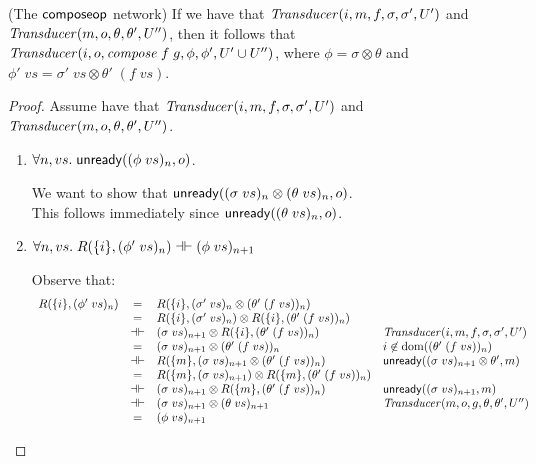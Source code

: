 \begin{lemma}{(The $\mathsf{composeop}$ network)}
If we have that $\mathit{Transducer}(i, m, f, \sigma, \sigma', U')$ and $\mathit{Transducer}(m, o, \theta, \theta', U'')$, 
then it follows that $\mathit{Transducer}(i, o, \mathit{compose}\;f\;g, \phi, \phi', U' \cup U'')$, where $\phi = \sigma \otimes \theta$
and $\phi'\;vs = \sigma'\;vs \otimes \theta'\;(f\;vs)$. 
\end{lemma}

\begin{proof}
Assume have that $\mathit{Transducer}(i, m, f, \sigma, \sigma', U')$ and $\mathit{Transducer}(m, o, \theta, \theta', U'')$. 
\begin{enumerate}
\item $\forall n, vs.\; \mathsf{unready}({(\phi\;vs)_n}, {o})$.

  \begin{tabbedproof}
    \oo We want to show that $\mathsf{unready}({(\sigma\;vs)_n \otimes (\theta\;vs)_n}, {o})$. \\
    \oo This follows immediately since $\mathsf{unready}({(\theta\;vs)_n}, {o})$.
  \end{tabbedproof}

\item $\forall n, vs.\; R(\{{i}\}, (\phi'\;vs)_n) \dashv\vdash (\phi\;vs)_{n+1}$

  Observe that:
  \begin{displaymath}
    \begin{array}{lcll}
      R(\{{i}\}, (\phi'\;vs)_n) & = & R(\{{i}\}, (\sigma'\;vs)_n \otimes (\theta'\;(f\;vs))_n) 
                            & \\
                            & = & R(\{{i}\}, (\sigma'\;vs)_n) \otimes R(\{{i}\}, (\theta'\;(f\;vs))_n) 
                            & \\
                            & \dashv\vdash & (\sigma\;vs)_{n+1} \otimes R(\{{i}\}, (\theta'\;(f\;vs))_n) 
                            & \mathit{Transducer}(i, m, f, \sigma, \sigma', U') \\
                            & = & (\sigma\;vs)_{n+1} \otimes (\theta'\;(f\;vs))_n 
                            & i \not\in \mbox{dom}({(\theta'\;(f\;vs))_n}) \\
                            & \dashv\vdash & R(\{{m}\}, (\sigma\;vs)_{n+1} \otimes (\theta'\;(f\;vs))_n) 
                            & \mathsf{unready}({(\sigma\;vs)_{n+1} \otimes \theta'}, {m}) \\
                            & = & R(\{{m}\}, (\sigma\;vs)_{n+1}) \otimes R(\{{m}\}, (\theta'\;(f\;vs))_n) 
                            & \\
                            & \dashv\vdash & (\sigma\;vs)_{n+1} \otimes R(\{{m}\}, (\theta'\;(f\;vs))_n) 
                            &  \mathsf{unready}({(\sigma\;vs)_{n+1}}, {m}) \\
                            & \dashv\vdash & (\sigma\;vs)_{n+1} \otimes (\theta\;vs)_{n+1} 
                            & \mathit{Transducer}(m, o, g, \theta, \theta', U'')  \\
                            & = & (\phi\;vs)_{n+1} & 
  \end{array}
  \end{displaymath}


\end{enumerate}
\end{proof}
